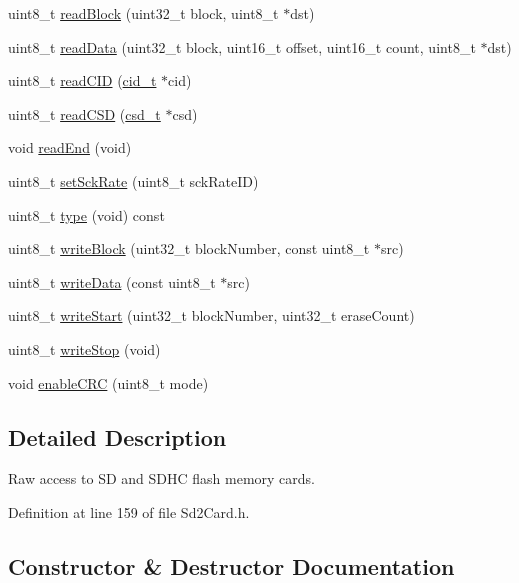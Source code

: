 \begin{DoxyCompactItemize}
uint8\+\_\+t \hyperlink{class_sd2_card_ae26d840449a42d45af464fb81b92e2ab}{read\+Block} (uint32\+\_\+t block, uint8\+\_\+t $\ast$dst)
\item 
uint8\+\_\+t \hyperlink{class_sd2_card_ae2d1396ad30081b4201cd372358ef699}{read\+Data} (uint32\+\_\+t block, uint16\+\_\+t offset, uint16\+\_\+t count, uint8\+\_\+t $\ast$dst)
\item 
uint8\+\_\+t \hyperlink{class_sd2_card_aee2be03d649548e2ab26033f18638d19}{read\+C\+ID} (\hyperlink{_sd_info_8h_structcid__t}{cid\+\_\+t} $\ast$cid)
\item 
uint8\+\_\+t \hyperlink{class_sd2_card_a79845d8d4593cb3b1b7641ba27edddfb}{read\+C\+SD} (\hyperlink{_sd_info_8h_unioncsd__t}{csd\+\_\+t} $\ast$csd)
\item 
void \hyperlink{class_sd2_card_a0de961537d051bbcafd87ed9fff5fe48}{read\+End} (void)
\item 
uint8\+\_\+t \hyperlink{class_sd2_card_ad849b8896de9abd4e24bd98f4204ccc4}{set\+Sck\+Rate} (uint8\+\_\+t sck\+Rate\+ID)
\item 
uint8\+\_\+t \hyperlink{class_sd2_card_a3ba97504f5928c932c346101d3dabfd2}{type} (void) const 
\item 
uint8\+\_\+t \hyperlink{class_sd2_card_ae9bdd6cff43b8b694584f9bae7e781b0}{write\+Block} (uint32\+\_\+t block\+Number, const uint8\+\_\+t $\ast$src)
\item 
uint8\+\_\+t \hyperlink{class_sd2_card_af602d107e1ead2d0971e9f4c7b744cf8}{write\+Data} (const uint8\+\_\+t $\ast$src)
\item 
uint8\+\_\+t \hyperlink{class_sd2_card_a82a21a07fdfe45c5c75d486a13cded8a}{write\+Start} (uint32\+\_\+t block\+Number, uint32\+\_\+t erase\+Count)
\item 
uint8\+\_\+t \hyperlink{class_sd2_card_a3a60481c0821606546a85d056bb96f47}{write\+Stop} (void)
\item 
void \hyperlink{class_sd2_card_a9a84ec97d0c21e4bef8e41630a795b85}{enable\+C\+RC} (uint8\+\_\+t mode)
\end{DoxyCompactItemize}


\subsection{Detailed Description}
Raw access to SD and S\+D\+HC flash memory cards. 

Definition at line 159 of file Sd2\+Card.\+h.



\subsection{Constructor \& Destructor Documentation}
